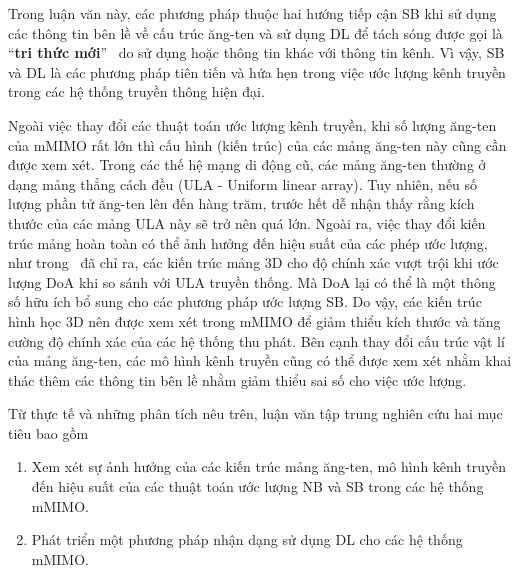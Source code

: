 Trong luận văn này, các phương pháp thuộc hai hướng tiếp cận SB khi sử dụng các thông tin bên lề về cấu trúc ăng-ten và sử dụng DL để tách sóng được gọi là ``\textbf{tri thức mới}''~\cite{InSI} do sử dụng hoặc thông tin khác với thông tin kênh.
Vì vậy, SB và DL là các phương pháp tiên tiến và hứa hẹn trong việc ước lượng kênh truyền trong các hệ thống truyền thông hiện đại.

Ngoài việc thay đổi các thuật toán ước lượng kênh truyền, khi số lượng ăng-ten của mMIMO rất lớn thì cấu hình (kiến trúc) của các mảng ăng-ten này cũng cần được xem xét. Trong các thế hệ mạng di động cũ, các mảng ăng-ten thường ở dạng mảng thẳng cách đều (ULA - Uniform linear array). Tuy nhiên, nếu số lượng phần tử ăng-ten lên đến hàng trăm, trước hết dễ nhận thấy rằng kích thước của các mảng ULA này sẽ trở nên quá lớn. Ngoài ra, việc thay đổi kiến trúc mảng hoàn toàn có thể ảnh hưởng đến hiệu suất của các phép ước lượng, như trong~\cite{POORMOHAMMAD2017} đã chỉ ra, các kiến trúc mảng 3D cho độ chính xác vượt trội khi ước lượng DoA khi so sánh với ULA truyền thống. Mà DoA lại có thể là một thông số hữu ích bổ sung cho các phương pháp ước lượng SB. Do vậy, các kiến trúc hình học 3D nên được xem xét trong mMIMO để giảm thiểu kích thước và tăng cường độ chính xác của các hệ thống thu phát. Bên cạnh thay đổi cấu trúc vật lí của mảng ăng-ten, các mô hình kênh truyền cũng có thể được xem xét nhằm khai thác thêm các thông tin bên lề nhằm giảm thiểu sai số cho việc ước lượng.

Từ thực tế và những phân tích nêu trên, luận văn tập trung nghiên cứu hai mục tiêu bao gồm
\begin{enumerate}
    \item Xem xét sự ảnh hưởng của các kiến trúc mảng ăng-ten, mô hình kênh truyền đến hiệu suất của các thuật toán ước lượng NB và SB trong các hệ thống mMIMO.
    
    \item Phát triển một phương pháp nhận dạng sử dụng DL cho các hệ thống mMIMO.
\end{enumerate}
\vspace{0.5cm}

